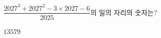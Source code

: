 $\dfrac{2027^3+2027^2-3\times 2027-6}{2025}$의 일의 자리의 숫자는?
\begin{choices32}{$1$}{$3$}{$5$}{$7$}{$9$}\end{choices32}
